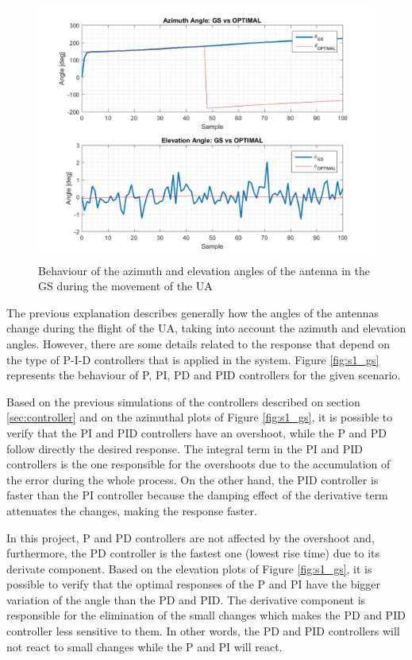 \begin{figure}[H]
	\centering
	\includegraphics[scale=0.75]{figures/s1_pd_gs.png}
	\caption{Behaviour of the azimuth and elevation angles of the antenna in the GS during the movement of the UA}
	\label{fig:s1_pd_gs_alone}
\end{figure}

The previous explanation describes generally how the angles of the antennas change during the flight of the UA, taking into account the azimuth and elevation angles. However, there are some details related to the response that depend on the type of P-I-D controllers that is applied in the system. Figure \ref{fig:s1_gs} represents the behaviour of P, PI, PD and PID controllers for the given scenario.

Based on the previous simulations of the controllers described on section \ref{sec:controller} and on the azimuthal plots of Figure \ref{fig:s1_gs}, it is possible to verify that the PI and PID controllers have an overshoot, while the P and PD follow directly the desired response. The integral term in the PI and PID controllers is the one responsible for the overshoots due to the accumulation of the error during the whole process. On the other hand, the PID controller is faster than the PI controller because the damping effect of the derivative term attenuates the changes, making the response faster.

In this project, P and PD controllers are not affected by the overshoot and, furthermore, the PD controller is the fastest one (lowest rise time) due to its derivate component.
Based on the elevation plots of Figure \ref{fig:s1_gs}, it is possible to verify that the optimal responses of the P and PI have the bigger variation of the angle than the PD and PID. The derivative component is responsible for the elimination of the small changes which makes the PD and PID controller less sensitive to them. In other words, the PD and PID controllers will not react to small changes while the P and PI will react.

